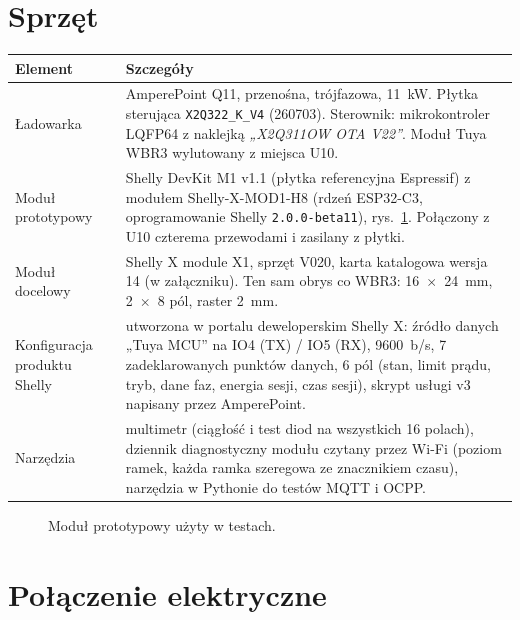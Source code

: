 \documentclass[11pt,a4paper]{article}
\begin{document}
\section{Sprzęt}

\begin{longtable}{>{\raggedright\arraybackslash}p{3.2cm}>{\raggedright\arraybackslash}p{12.9cm}}
\toprule
\rowcolor{aphead}\textbf{Element} & \textbf{Szczegóły} \\
\midrule\endhead
\bottomrule\endfoot
Ładowarka & AmperePoint Q11, przenośna, trójfazowa, 11~kW. Płytka sterująca \texttt{X2Q322\_K\_V4} (260703). Sterownik: mikrokontroler LQFP64 z naklejką \emph{„X2Q311OW OTA V22”}. Moduł Tuya WBR3 wylutowany z miejsca U10. \\
Moduł prototypowy & Shelly DevKit M1 v1.1 (płytka referencyjna Espressif) z modułem Shelly-X-MOD1-H8 (rdzeń ESP32-C3, oprogramowanie Shelly \texttt{2.0.0-beta11}), rys.~\ref{fig:devkit}. Połączony z U10 czterema przewodami i zasilany z płytki. \\
Moduł docelowy & Shelly X module X1, sprzęt V020, karta katalogowa wersja 14 (w załączniku). Ten sam obrys co WBR3: 16~$\times$~24~mm, 2~$\times$~8 pól, raster 2~mm. \\
Konfiguracja produktu Shelly & utworzona w portalu deweloperskim Shelly X: źródło danych „Tuya MCU” na IO4 (TX) / IO5 (RX), 9600~b/s, 7 zadeklarowanych punktów danych, 6 pól (stan, limit prądu, tryb, dane faz, energia sesji, czas sesji), skrypt usługi v3 napisany przez AmperePoint. \\
Narzędzia & multimetr (ciągłość i test diod na wszystkich 16 polach), dziennik diagnostyczny modułu czytany przez Wi-Fi (poziom ramek, każda ramka szeregowa ze znacznikiem czasu), narzędzia w Pythonie do testów MQTT i OCPP. \\
\end{longtable}

\begin{figure}[H]
\centering
{}\hspace{0.6cm}
\caption{Moduł prototypowy użyty w testach.}
\label{fig:devkit}
\end{figure}

\section{Połączenie elektryczne}
\end{document}
